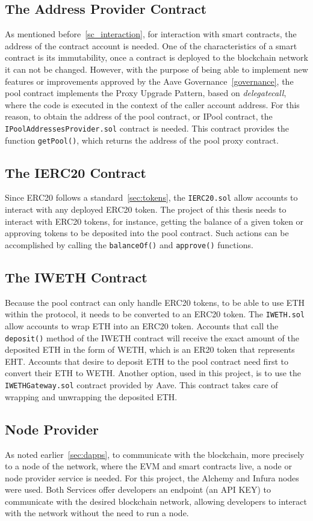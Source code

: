 \documentclass[11pt,a4paper]{report}
\begin{document}
\subsection{The Address Provider Contract}
As mentioned before~\ref{sc_interaction}, for interaction with smart contracts, the address of the contract account is needed. One of the characteristics of a smart contract is its immutability, once a contract is deployed to the blockchain network it can not be changed. However, with the purpose of being able to implement new features or improvements approved by the Aave Governance~\ref{governance}, the pool contract implements the Proxy Upgrade Pattern\cite{ozproxy}, based on \textit{delegatecall}\cite{delegatecall}, where the code is executed in the context of the caller account address. For this reason, to obtain the address of the pool contract, or IPool contract, the \verb|IPoolAddressesProvider.sol|\cite{pooladdrprov} contract is needed. This contract provides the function \verb|getPool()|, which returns the address of the pool proxy contract.
\subsection{The IERC20 Contract}
Since ERC20 follows a standard~\ref{sec:tokens}, the \verb|IERC20.sol| allow accounts to interact with any deployed ERC20 token. The project of this thesis needs to interact with ERC20 tokens, for instance, getting the balance of a given token or approving tokens to be deposited into the pool contract. Such actions can be accomplished by calling the \verb|balanceOf()| and \verb|approve()| functions.
\subsection{The IWETH Contract}
Because the pool contract can only handle ERC20 tokens, to be able to use ETH within the protocol, it needs to be converted to an ERC20 token. The \verb|IWETH.sol| allow accounts to wrap ETH into an ERC20 token. Accounts that call the \verb|deposit()| method of the IWETH contract will receive the exact amount of the deposited ETH in the form of WETH, which is an ER20 token that represents EHT. Accounts that desire to deposit ETH to the pool contract need first to convert their ETH to WETH. Another option, used in this project, is to use the \verb|IWETHGateway.sol|\cite{wethgateway} contract provided by Aave. This contract takes care of wrapping and unwrapping the deposited ETH.
\subsection{Node Provider}
As noted earlier~\ref{sec:dapps}, to communicate with the blockchain, more precisely to a node of the network, where the EVM and smart contracts live, a node or node provider service is needed. For this project, the Alchemy\cite{alchemy} and Infura\cite{infura} nodes were used. Both Services offer developers an endpoint (an API KEY) to communicate with the desired blockchain network, allowing developers to interact with the network without the need to run a node.
\end{document}
